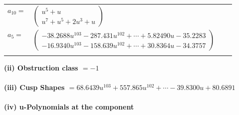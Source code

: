 \documentclass[1p]{elsarticle_modified}
\theoremstyle{definition}
\begin{document}
\begin{tabular}{m{7pt} m{180pt} m{7pt} m{180pt} }
\flushright $a_{10}=$&$\begin{pmatrix}u^5+u\\u^7+u^5+2 u^3+u\end{pmatrix}$ \\
\flushright $a_{5}=$&$\begin{pmatrix}-38.2688 u^{103}-287.431 u^{102}+\cdots+5.82490 u-35.2283\\-16.9340 u^{103}-158.639 u^{102}+\cdots+30.8364 u-34.3757\end{pmatrix}$\\&\end{tabular}
\flushleft \textbf{(ii) Obstruction class $= -1$}\\~\\
\flushleft \textbf{(iii) Cusp Shapes $= 68.6439 u^{103}+557.865 u^{102}+\cdots-39.8300 u+80.6891$}\\~\\
\newpage\renewcommand{\arraystretch}{1}
\flushleft \textbf{(iv) u-Polynomials at the component}\newline \\
\end{document}
